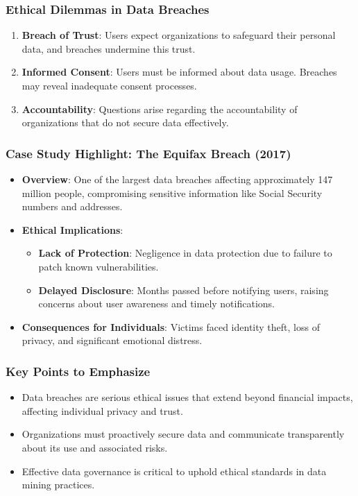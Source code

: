 \documentclass{beamer}
\begin{document}
\begin{frame}[fragile]
    \frametitle{Ethical Dilemmas in Data Breaches}
    \begin{enumerate}
        \item \textbf{Breach of Trust}: Users expect organizations to safeguard their personal data, and breaches undermine this trust.
        \item \textbf{Informed Consent}: Users must be informed about data usage. Breaches may reveal inadequate consent processes.
        \item \textbf{Accountability}: Questions arise regarding the accountability of organizations that do not secure data effectively.
    \end{enumerate}
\end{frame}

\begin{frame}[fragile]
    \frametitle{Case Study Highlight: The Equifax Breach (2017)}
    \begin{itemize}
        \item \textbf{Overview}: One of the largest data breaches affecting approximately 147 million people, compromising sensitive information like Social Security numbers and addresses.
        
        \item \textbf{Ethical Implications}:
        \begin{itemize}
            \item \textbf{Lack of Protection}: Negligence in data protection due to failure to patch known vulnerabilities.
            \item \textbf{Delayed Disclosure}: Months passed before notifying users, raising concerns about user awareness and timely notifications.
        \end{itemize}
        
        \item \textbf{Consequences for Individuals}: Victims faced identity theft, loss of privacy, and significant emotional distress.
    \end{itemize}
\end{frame}

\begin{frame}[fragile]
    \frametitle{Key Points to Emphasize}
    \begin{itemize}
        \item Data breaches are serious ethical issues that extend beyond financial impacts, affecting individual privacy and trust.
        \item Organizations must proactively secure data and communicate transparently about its use and associated risks.
        \item Effective data governance is critical to uphold ethical standards in data mining practices.
    \end{itemize}
\end{frame}
\end{document}
